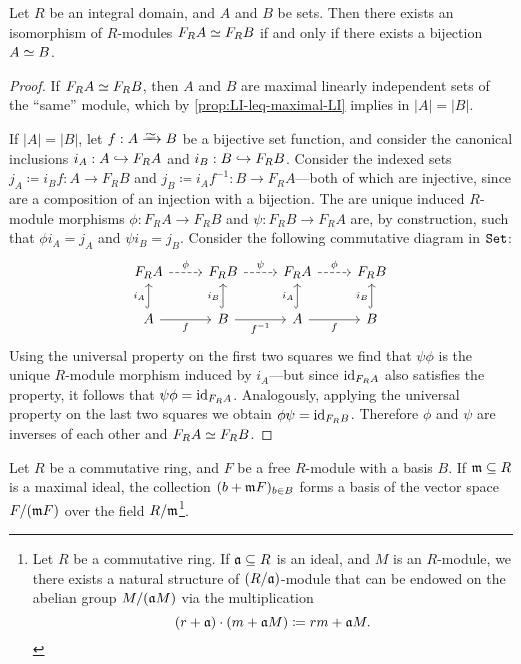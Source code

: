 \begin{corollary}
    \label{cor:integral-domain-satisfies-IBN}
    Let \(R\) be an integral domain, and \(A\) and \(B\) be sets. Then there exists
    an isomorphism of \(R\)-modules \(F_R A \simeq F_R B\) if and only if there exists
    a bijection \(A \simeq B\).
\end{corollary}

\begin{proof}
    If \(F_R A \simeq F_R B\), then \(A\) and \(B\) are maximal linearly independent
    sets of the ``same'' module, which by \cref{prop:LI-leq-maximal-LI} implies in
    \(|A| = |B|\).

    If \(|A| = |B|\), let \(f: A \isoto B\) be a bijective set function, and
    consider the canonical inclusions \(i_A: A \hookrightarrow F_R A\) and
    \(i_B: B \hookrightarrow F_R B\). Consider the indexed sets
    \(j_A \coloneq i_B f: A \to F_R B\) and
    \(j_B \coloneq i_A f^{-1}: B \to F_R A\)---both of which are injective, since
    are a composition of an injection with a bijection. The are unique induced
    \(R\)-module morphisms \(\phi: F_R A \to F_R B\) and \(\psi: F_R B \to F_R A\)
    are, by construction, such that \(\phi i_A = j_A\) and \(\psi i_B =
    j_B\). Consider the following commutative diagram in \({\texttt{Set}}\):
    \[
        \begin{tikzcd}
            F_R A \ar[r, dashed, "\phi"]
            &F_R B \ar[r, dashed, "\psi"]
            &F_R A \ar[r, dashed, "\phi"]
            &F_R B
            \\
            A \ar[u, hook, "i_A"] \ar[r, "f"']
            &B \ar[u, hook, "i_B"] \ar[r, "f^{-1}"']
            &A \ar[u, hook, "i_A"] \ar[r, "f"']
            &B \ar[u, hook, "i_B"]
        \end{tikzcd}
    \]
    Using the universal property on the first two squares we find that \(\psi \phi\)
    is the unique \(R\)-module morphism induced by \(i_A\)---but since
    \(\operatorname{id}_{F_R A}\) also satisfies the property, it follows that
    \(\psi \phi = \operatorname{id}_{F_R A}\). Analogously, applying the universal property on the
    last two squares we obtain \(\phi \psi = \operatorname{id}_{F_R B}\). Therefore \(\phi\) and
    \(\psi\) are inverses of each other and \(F_R A \simeq F_R B\).
\end{proof}

\begin{lemma}
    \label{lem:basis-free-to-basis-vector-space}
    Let \(R\) be a commutative ring, and \(F\) be a free \(R\)-module with a basis
    \(B\). If \(\mathfrak{m} \subseteq R\) is a maximal ideal, the collection
    \((b + \mathfrak{m} F)_{b \in B}\) forms a basis of the vector space
    \(F/(\mathfrak{m} F)\) over the field \(R/\mathfrak{m}\)\footnote{Let \(R\) be a
    commutative ring. If \(\mathfrak{a} \subseteq R\) is an ideal, and \(M\) is an
    \(R\)-module, we there exists a natural structure of \((R/{\mathfrak{a}})\)-module
    that can be endowed on the abelian group \(M/(\mathfrak{a} M)\) via the
    multiplication
    \[
        (r + \mathfrak{a}) \cdot (m + \mathfrak{a} M) \coloneq r m + \mathfrak{a} M.
    \]
    }.
\end{lemma}

